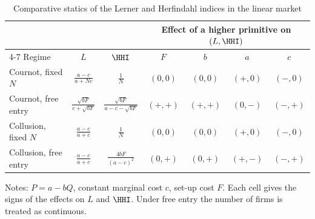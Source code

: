 \begin{table}[htbp]
\centering
\begin{threeparttable}
\caption{Comparative statics of the Lerner and Herfindahl indices in the linear market}
\label{tab:02-LH-cases}
\renewcommand{\arraystretch}{1.6}
\begin{tabular}{@{}lcccccc@{}}
\toprule
 & & & \multicolumn{4}{c}{Effect of a higher primitive on $(L, \HHI)$} \\
\cmidrule(l){4-7}
Regime & $L$ & $\HHI$ & $F$ & $b$ & $a$ & $c$ \\
\midrule
Cournot, fixed $N$ & $\frac{a - c}{a + Nc}$ & $\frac{1}{N}$ & $(0, 0)$ & $(0, 0)$ & $(+, 0)$ & $(-, 0)$ \\
Cournot, free entry & $\frac{\sqrt{bF}}{c + \sqrt{bF}}$ & $\frac{\sqrt{bF}}{a - c - \sqrt{bF}}$ & $(+, +)$ &
  $(+, +)$ & $(0, -)$ & $(-, +)$ \\
Collusion, fixed $N$ & $\frac{a - c}{a + c}$ & $\frac{1}{N}$ & $(0, 0)$ & $(0, 0)$ & $(+, 0)$ & $(-, 0)$ \\
Collusion, free entry & $\frac{a - c}{a + c}$ & $\frac{4bF}{(a - c)^2}$ & $(0, +)$ & $(0, +)$ & $(+, -)$ &
  $(-, +)$ \\
\bottomrule
\end{tabular}
\begin{tablenotes}\footnotesize
\item Notes: $P = a - bQ$, constant marginal cost $c$, set-up cost $F$. Each cell gives the signs of the effects on
$L$ and $\HHI$. Under free entry the number of firms is treated as continuous.
\end{tablenotes}
\end{threeparttable}
\end{table}


